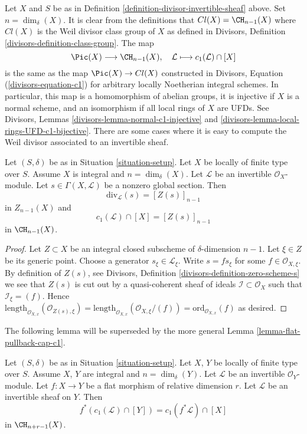 \noindent
Let $X$ and $S$ be as in Definition \ref{definition-divisor-invertible-sheaf}
above. Set $n = \dim_\delta(X)$. It is clear from the definitions that
$Cl(X) = \CH_{n - 1}(X)$ where $Cl(X)$ is the Weil divisor class group of $X$
as defined in Divisors, Definition \ref{divisors-definition-class-group}.
The map
$$
\Pic(X) \longrightarrow \CH_{n - 1}(X), \quad
\mathcal{L} \longmapsto c_1(\mathcal{L}) \cap [X]
$$
is the same as the map $\Pic(X) \to Cl(X)$ constructed in
Divisors, Equation (\ref{divisors-equation-c1}) for arbitrary
locally Noetherian integral schemes. In particular, this map
is a homomorphism of abelian groups, it is injective if $X$ is
a normal scheme, and an isomorphism if all local rings of $X$
are UFDs. See Divisors, Lemmas \ref{divisors-lemma-normal-c1-injective} and
\ref{divisors-lemma-local-rings-UFD-c1-bijective}.
There are some cases where it is easy to compute the
Weil divisor associated to an invertible sheaf.

\begin{lemma}
\label{lemma-compute-c1}
Let $(S, \delta)$ be as in Situation \ref{situation-setup}.
Let $X$ be locally of finite type over $S$. Assume $X$ is
integral and $n = \dim_\delta(X)$.
Let $\mathcal{L}$ be an invertible $\mathcal{O}_X$-module.
Let $s \in \Gamma(X, \mathcal{L})$ be a nonzero global section.
Then
$$
\text{div}_\mathcal{L}(s) = [Z(s)]_{n - 1}
$$
in $Z_{n - 1}(X)$ and
$$
c_1(\mathcal{L}) \cap [X] = [Z(s)]_{n - 1}
$$
in $\CH_{n - 1}(X)$.
\end{lemma}

\begin{proof}
Let $Z \subset X$ be an integral closed subscheme of
$\delta$-dimension $n - 1$. Let $\xi \in Z$ be its generic
point. Choose a generator $s_\xi \in \mathcal{L}_\xi$.
Write $s = fs_\xi$ for some $f \in \mathcal{O}_{X, \xi}$.
By definition of $Z(s)$, see
Divisors, Definition \ref{divisors-definition-zero-scheme-s}
we see that $Z(s)$ is cut out by a quasi-coherent
sheaf of ideals $\mathcal{I} \subset \mathcal{O}_X$ such
that $\mathcal{I}_\xi = (f)$. Hence
$\text{length}_{\mathcal{O}_{X, x}}(\mathcal{O}_{Z(s), \xi})
=
\text{length}_{\mathcal{O}_{X, x}}(\mathcal{O}_{X, \xi}/(f))
=
\text{ord}_{\mathcal{O}_{X, x}}(f)$ as desired.
\end{proof}

\noindent
The following lemma will be superseded by the more general
Lemma \ref{lemma-flat-pullback-cap-c1}.

\begin{lemma}
\label{lemma-flat-pullback-divisor-invertible-sheaf}
Let $(S, \delta)$ be as in Situation \ref{situation-setup}.
Let $X$, $Y$ be locally of finite type over $S$. Assume $X$, $Y$
are integral and $n = \dim_\delta(Y)$.
Let $\mathcal{L}$ be an invertible $\mathcal{O}_Y$-module.
Let $f : X \to Y$ be a flat morphism of relative dimension $r$.
Let $\mathcal{L}$ be an invertible sheaf on $Y$. Then
$$
f^*(c_1(\mathcal{L}) \cap [Y]) = c_1(f^*\mathcal{L}) \cap [X]
$$
in $\CH_{n + r - 1}(X)$.
\end{lemma}

